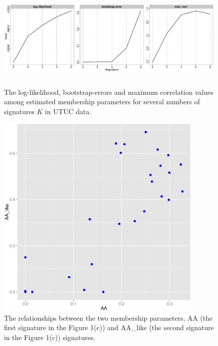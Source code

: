 \documentclass{article}
\begin{document}
\begin{figure}
\centering
\includegraphics[width=15cm,height=5cm]{UTUC_stat.eps}
\caption{The log-likelihood, bootstrap-errors and maximum correlation values among estimated membership parameters for several numbers of signatures $K$ in UTUC data.}
\label{UTUC_stat}
\end{figure}


\begin{figure}
\centering
\includegraphics[width=10cm,height=10cm]{UTUC_AA_AAlike_cor.eps}
\caption{The relationships between the two membership parameters, AA (the first signature in the Figure 1(c)) and AA\_like (the second signature in the Figure 1(c)) signatures.}
\label{UTUT_AA_AAlike}
\end{figure}
\end{document}
